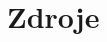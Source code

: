 \documentclass[a4paper,11pt]{article}
\begin{document}
\newpage

\section{Zdroje}
\nocite{*}

\printbibliography
\end{document}
